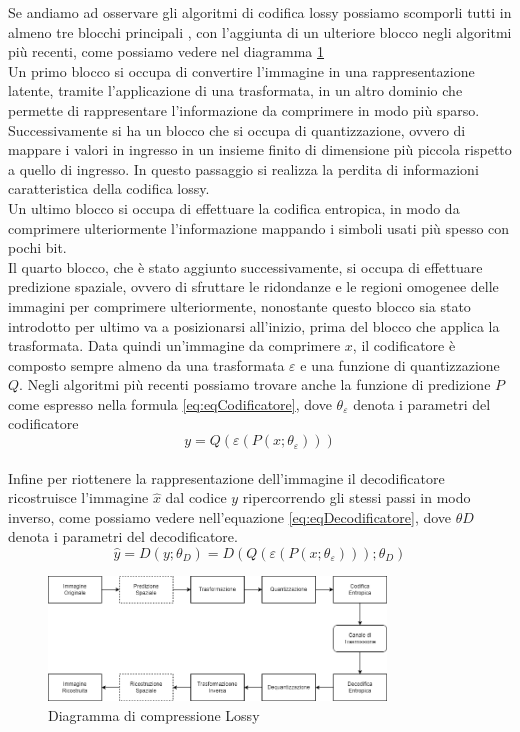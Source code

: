 Se andiamo ad osservare gli algoritmi di codifica lossy possiamo scomporli tutti in almeno tre blocchi principali \cite{sadeeq2021image}, con l’aggiunta di un ulteriore blocco negli algoritmi più recenti, come possiamo vedere nel diagramma \ref{fig:LossyCompressorDiagram} \\
Un primo blocco si occupa di convertire l’immagine in una rappresentazione latente, tramite l’applicazione di una trasformata, in un altro dominio che permette di rappresentare l’informazione da comprimere in modo più sparso.\\
Successivamente si ha un blocco che si occupa di quantizzazione, ovvero di mappare i valori in ingresso in un insieme finito di dimensione più piccola rispetto a quello di ingresso. In questo passaggio si realizza la perdita di informazioni caratteristica della codifica lossy.\\
Un ultimo blocco si occupa di effettuare la codifica entropica, in modo da comprimere ulteriormente l’informazione mappando i simboli usati più spesso con pochi bit.\\
Il quarto blocco, che è stato aggiunto successivamente, si occupa di effettuare predizione spaziale, ovvero di sfruttare le ridondanze e le regioni omogenee delle immagini per comprimere ulteriormente, nonostante questo blocco sia stato introdotto per ultimo va a posizionarsi all’inizio, prima del blocco che applica la trasformata.
Data quindi un’immagine da comprimere $x$, il codificatore è composto sempre almeno da una trasformata  $\varepsilon$ e una funzione di quantizzazione $Q$. Negli algoritmi più recenti possiamo trovare anche la funzione di predizione $P$ come espresso nella formula \ref{eq:eqCodificatore}, dove $\theta_{\varepsilon}$ denota i parametri del codificatore
\begin{equation}\label{eq:eqCodificatore}
    y = Q(\varepsilon(P(x;\theta_{\varepsilon})))
\end{equation}\\
Infine per riottenere la rappresentazione dell’immagine il decodificatore ricostruisce l’immagine $\hat{x}$ dal codice $y$ ripercorrendo gli stessi passi in modo inverso, come possiamo vedere nell’equazione \ref{eq:eqDecodificatore}, dove $\theta{D}$ denota i parametri del decodificatore. \cite{hu2021learning}\\
\begin{equation}\label{eq:eqDecodificatore}
    \hat{y} = D(y;\theta_{D}) = D(Q(\varepsilon(P(x;\theta_{\varepsilon})));\theta_{D})
\end{equation}

\begin{figure}[t!]
    \centering
    \includegraphics[width=0.8\textwidth]{Immagini/LossyCompressorDiagram.png}
    \caption{Diagramma di compressione Lossy}
    \label{fig:LossyCompressorDiagram}
\end{figure}
